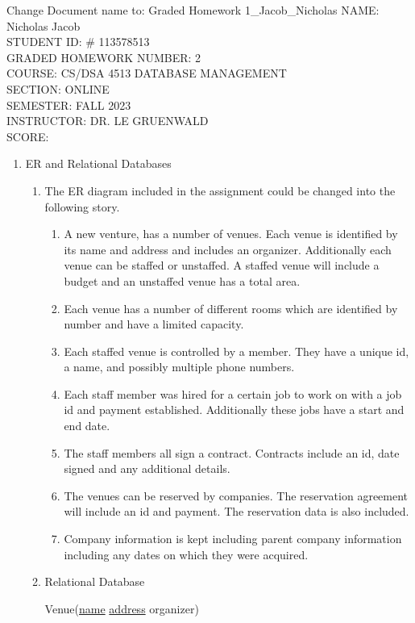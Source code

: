 \documentclass[11pt]{article}
\author{}
\title{}
\begin{document}
{\Large
Change Document name to: Graded Homework 1\_Jacob\_Nicholas
\noindent NAME:  Nicholas Jacob\\ 
STUDENT ID: \# 113578513\\
GRADED HOMEWORK NUMBER: 2\\
COURSE: CS/DSA 4513 DATABASE MANAGEMENT\\ 
SECTION: ONLINE\\SEMESTER: FALL 2023\\
INSTRUCTOR:  DR. LE GRUENWALD\\
 SCORE:}

\newpage
\begin{enumerate}
\item ER and Relational Databases
\begin{enumerate}
\item The ER diagram included in the assignment could be changed into the following story.
\begin{enumerate}
\item A new venture, has a number of venues.  Each venue is identified by its name and address and includes an organizer.  Additionally each venue can be staffed or unstaffed.  A staffed venue will include a budget and an unstaffed venue has a total area.
\item Each venue has a number of different rooms which are identified by number and have a limited capacity.
\item Each staffed venue is controlled by a member.  They have a unique id, a name, and possibly multiple phone numbers.
\item Each staff member was hired for a certain job to work on with a job id and payment established. Additionally these jobs have a start and end date.
\item The staff members all sign a contract.  Contracts include an id, date signed and any additional details.
\item The venues can be reserved by companies.  The reservation agreement will include an id and payment.  The reservation data is also included.
\item Company information is kept including parent company information including any dates on which they were acquired.
\end{enumerate}
\item Relational Database

Venue(\underline {name} \underline{address} organizer)

\end{enumerate}



\end{enumerate}
\end{document}
